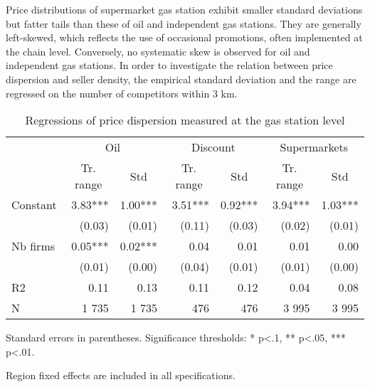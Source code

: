\documentclass[english]{article}
\begin{document}
Price distributions of supermarket gas station exhibit smaller standard deviations but fatter tails than these of oil and independent gas stations. They are generally left-skewed, which reflects the use of occasional promotions, often implemented at the chain level. Conversely, no systematic skew is observed for oil and independent gas stations. In order to investigate the relation between price dispersion and seller density, the empirical standard deviation and the range are regressed on the number of competitors within 3 km.

\begin{table}[H]
\caption{Regressions of price dispersion measured at the gas station level}
\label{tab:station_price_support_regs}
\begin{threeparttable}
\begin{tabular}{lrrrrrr}
    \toprule
    \toprule
          & \multicolumn{2}{c}{Oil} & \multicolumn{2}{c}{Discount} & \multicolumn{2}{c}{Supermarkets} \\
          & \multicolumn{1}{c}{Tr. range} & \multicolumn{1}{c}{Std} & \multicolumn{1}{c}{Tr. range} & \multicolumn{1}{c}{Std} & \multicolumn{1}{c}{Tr. range} & \multicolumn{1}{c}{Std} \\
    \midrule
    Constant & 3.83*** & 1.00*** & 3.51*** & 0.92*** & 3.94*** & 1.03*** \\
          & (0.03) & (0.01) & (0.11) & (0.03) & (0.02) & (0.01) \\
    Nb firms & 0.05*** & 0.02*** & 0.04  & 0.01  & 0.01  & 0.00 \\
          & (0.01) & (0.00) & (0.04) & (0.01) & (0.01) & (0.00) \\
    \midrule
    R2    & 0.11  & 0.13  & 0.11  & 0.12  & 0.04  & 0.08 \\
    N     & 1 735 & 1 735 &  476  &  476  & 3 995 & 3 995 \\
    \bottomrule
    \bottomrule
\end{tabular}
\begin{tablenotes}
      \small
      \item Standard errors in parentheses. Significance thresholds: * p<.1, ** p<.05, *** p<.01.
      \item Region fixed effects are included in all specifications.
\end{tablenotes}
\end{threeparttable}
\end{table}
\end{document}
